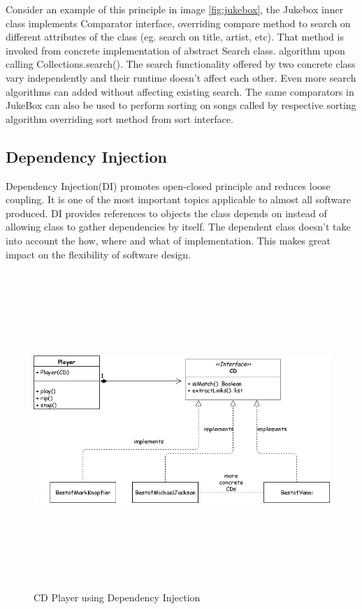 \noindent
Consider an example of this principle in image \ref{fig:jukebox}, the Jukebox inner class implements Comparator interface, overriding compare method to search on different attributes of the class (eg. search on title, artist, etc). That method is invoked from concrete implementation of abstract Search class.
algorithm upon calling Collections.search(). The search functionality offered by two concrete class vary
independently and their runtime doesn't affect each other. Even more search algorithms can added without
affecting existing search. The same comparators in JukeBox can also be used to perform sorting on songs
called by respective sorting algorithm overriding sort method from sort interface.

\pagebreak

\subsection{Dependency Injection}\label{diuse}
Dependency Injection(DI) promotes open-closed principle and reduces loose coupling. It is one of the most
important topics applicable to almost all software produced. DI provides references to objects the class
depends on instead of allowing class to gather dependencies by itself. The dependent class doesn't
take into account the how, where and what of implementation. This makes great impact on the flexibility of
software design.
\begin{figure}[h!]
  \centering
  \includegraphics[width=15cm,height=12cm,keepaspectratio]{../media/crawler/dinjection.png}
  \caption{CD Player using Dependency Injection}
  \label{fig:dinjection}
\end{figure}

